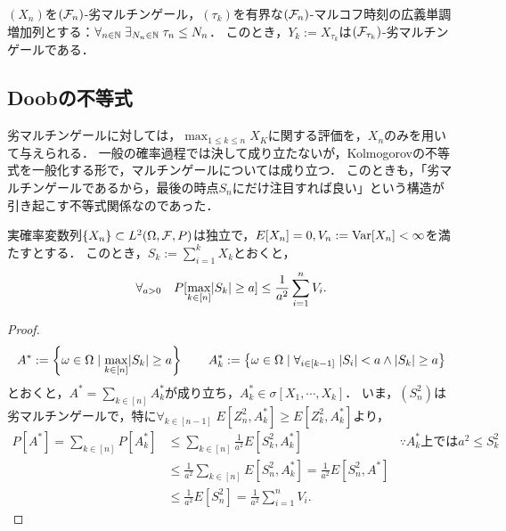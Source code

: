 \documentclass[uplatex,dvipdfmx]{jsreport}
\begin{document}
\begin{corollary}[任意抽出マルチンゲール性]
    $(X_n)$を$(\mathcal{F}_n)$-劣マルチンゲール，$(\tau_k)$を有界な$(\mathcal{F}_n)$-マルコフ時刻の広義単調増加列とする：$\forall_{n\in\mathbb{N}}\;\exists_{N_n\in\mathbb{N}}\;\tau_n\le N_n$．
    このとき，$Y_k:=X_{\tau_k}$は$(\mathcal{F}_{\tau_k})$-劣マルチンゲールである．
\end{corollary}

\subsection{Doobの不等式}

\begin{tcolorbox}[colframe=ForestGreen, colback=ForestGreen!10!white,breakable,colbacktitle=ForestGreen!40!white,coltitle=black,fonttitle=\bfseries\sffamily,
title=]
    劣マルチンゲールに対しては，$\max_{1\le k\le n}X_K$に関する評価を，$X_n$のみを用いて与えられる．
    一般の確率過程では決して成り立たないが，Kolmogorovの不等式を一般化する形で，マルチンゲールについては成り立つ．
    このときも，「劣マルチンゲールであるから，最後の時点$S_n$にだけ注目すれば良い」という構造が引き起こす不等式関係なのであった．
\end{tcolorbox}

\begin{theorem}[Kolmogorov]
    実確率変数列$\{X_n\}\subset L^2(\Omega,\mathcal{F},P)$は独立で，$E[X_n]=0,V_n:=\mathrm{Var}[X_n]<\infty$を満たすとする．
    このとき，$S_k:=\sum^k_{i=1}X_k$とおくと，
    \[\forall_{a>0}\quad P[\max_{k\in[n]}\lvert S_k\rvert\ge a]\le\frac{1}{a^2}\sum^n_{i=1}V_i.\]
\end{theorem}
\begin{proof}
    \[A^*:=\left\{\omega\in\Omega\mid\max_{k\in[n]}\lvert S_k\rvert\ge a\right\}\qquad A^*_k:=\left\{\omega\in\Omega\mid\forall_{i\in[k-1]}\;\lvert S_i\rvert<a\land\lvert S_k\rvert\ge a\right\}\]
    とおくと，$A^*=\sum_{k\in[n]}A^*_k$が成り立ち，$A^*_k\in\sigma[X_1,\cdots,X_k]$．
    いま，$(S^2_n)$は劣マルチンゲールで，特に$\forall_{k\in[n-1]}\;E[Z^2_n,A_k^*]\ge E[Z_k^2,A_k^*]$より，
    \begin{align*}
        P[A^*]=\sum_{k\in[n]}P[A^*_k]&\le\sum_{k\in[n]}\frac{1}{a^2}E[S_k^2,A_k^*]&\because A^*_k\text{上では}a^2\le S^2_k\\
        &\le\frac{1}{a^2}\sum_{k\in[n]}E[S_n^2,A^*_k]
        =\frac{1}{a^2}E[S_n^2,A^*]\\
        &\le\frac{1}{a^2}E[S_n^2]
        =\frac{1}{a^2}\sum^n_{i=1}V_i.
    \end{align*}
\end{proof}
\end{document}
